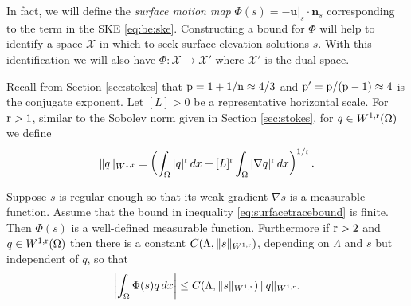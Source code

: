 \documentclass[hidelinks,onefignum,onetabnum,final]{siamart220329}  %
\newcommand{\grad}{\nabla}
\newcommand{\bn}{\mathbf{n}}
\newcommand{\bu}{\mathbf{u}}
\newcommand{\cX}{\mathcal{X}}
\newcommand{\nn}{{\text{\textnormal{n}}}}
\newcommand{\pp}{{\text{\textnormal{p}}}}
\newcommand{\rr}{{\text{\textnormal{r}}}}
\begin{document}
In fact, we will define the \emph{surface motion map} $\Phi(s) = - \bu|_s\cdot \bn_s$ corresponding to the term in the SKE \eqref{eq:be:ske}.  Constructing a bound for $\Phi$ will help to identify a space $\cX$ in which to seek surface elevation solutions $s$.  With this identification we will also have $\Phi:\cX \to \cX'$ where $\cX'$ is the dual space.

Recall from Section \ref{sec:stokes} that $\pp=1+1/\nn \approx 4/3$ and $\pp'=\pp/(\pp-1) \approx 4$ is the conjugate exponent.  Let $[L]>0$ be a representative horizontal scale.  For $\rr>1$, similar to the Sobolev norm given in Section \ref{sec:stokes}, for $q\in W^{1,\rr}(\Omega)$ we define
\begin{equation}
\|q\|_{W^{1,\rr}} = \left(\int_\Omega |q|^\rr\,dx + [L]^\rr \int_\Omega |\grad q|^\rr\,dx\right)^{1/\rr}. \label{eq:norm:Omega}
\end{equation}

\begin{lemma}[Bound on $\Phi(s)=- \bu|_s\cdot \bn_s$] \label{lem:phibound:early}
Suppose $s$ is regular enough so that its weak gradient $\grad s$ is a measurable function.  Assume that the bound in inequality \eqref{eq:surfacetracebound} is finite.  Then $\Phi(s)$ is a well-defined measurable function.  Furthermore if $\rr > 2$ and $q\in W^{1,\rr}(\Omega)$ then there is a constant $C(\Lambda,\|s\|_{W^{1,\rr}})$, depending on $\Lambda$ and $s$ but independent of $q$, so that
\begin{equation}
\left|\int_\Omega \Phi(s) q\,dx\right| \le C(\Lambda,\|s\|_{W^{1,\rr}})\, \|q\|_{W^{1,\rr}}.  \label{eq:phibound:early}
\end{equation}
\end{lemma}
\end{document}
